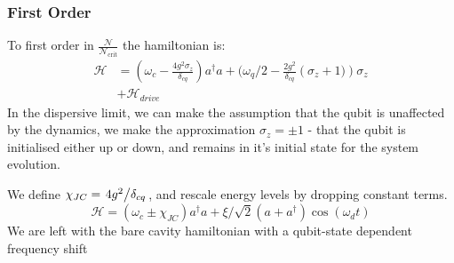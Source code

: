 \subsubsection{First Order}
To first order in $\frac{\mathscr{N}}{\mathscr{N}_{\text{crit}}}$ the hamiltonian is:
\begin{align}
  \mathscr{H} &= \left(\omega_c
    - \frac{4g^2\sigma_z}{\delta_{cq}}\right) a ^ \dagger a
    + (\omega_q/2 - \frac{2g^2}{\delta_{cq}} \left(\sigma_z + 1)\right)\sigma_z\nonumber\\
    &+ \mathscr{H}_{drive}
\end{align}
In the dispersive limit, we can make the assumption that the qubit is unaffected by the dynamics, we make the approximation $\sigma_z = \pm 1$ - that the qubit is initialised either up or down, and remains in it's initial state for the system evolution.

We define $\chi_{JC} = \flatfrac{4g^2}{\delta_{cq}}$, and rescale energy levels by dropping constant terms.
\begin{equation}
    \mathscr{H} = \left(\omega_c \pm \chi_{JC}\right) a ^ \dagger a
    + \xi/\sqrt{2} ( a + a^\dagger ) \cos(\omega_d t)
\end{equation}
We are left with the bare cavity hamiltonian with a qubit-state dependent frequency shift
